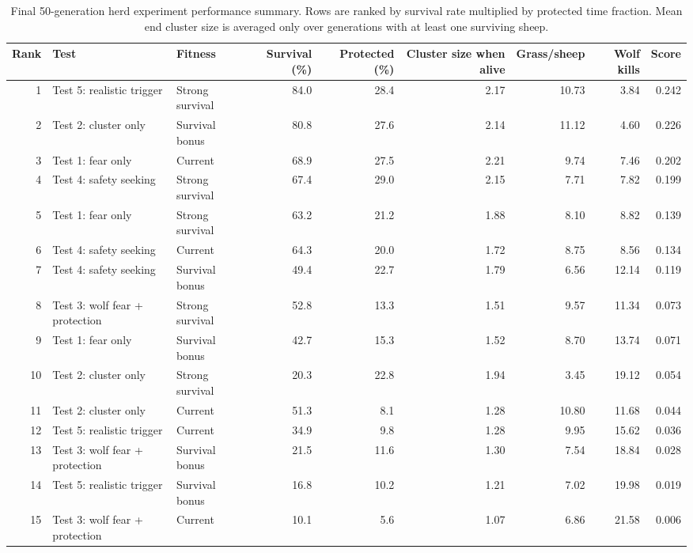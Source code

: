 \begin{table}[ht]
\centering
\caption{Final 50-generation herd experiment performance summary. Rows are ranked by survival rate multiplied by protected time fraction. Mean end cluster size is averaged only over generations with at least one surviving sheep.}
\begin{tabular}{rllrrrrrr}
\hline
Rank & Test & Fitness & Survival (\%) & Protected (\%) & Cluster size when alive & Grass/sheep & Wolf kills & Score \\
\hline
1 & Test 5: realistic trigger & Strong survival & 84.0 & 28.4 & 2.17 & 10.73 & 3.84 & 0.242 \\
2 & Test 2: cluster only & Survival bonus & 80.8 & 27.6 & 2.14 & 11.12 & 4.60 & 0.226 \\
3 & Test 1: fear only & Current & 68.9 & 27.5 & 2.21 & 9.74 & 7.46 & 0.202 \\
4 & Test 4: safety seeking & Strong survival & 67.4 & 29.0 & 2.15 & 7.71 & 7.82 & 0.199 \\
5 & Test 1: fear only & Strong survival & 63.2 & 21.2 & 1.88 & 8.10 & 8.82 & 0.139 \\
6 & Test 4: safety seeking & Current & 64.3 & 20.0 & 1.72 & 8.75 & 8.56 & 0.134 \\
7 & Test 4: safety seeking & Survival bonus & 49.4 & 22.7 & 1.79 & 6.56 & 12.14 & 0.119 \\
8 & Test 3: wolf fear + protection & Strong survival & 52.8 & 13.3 & 1.51 & 9.57 & 11.34 & 0.073 \\
9 & Test 1: fear only & Survival bonus & 42.7 & 15.3 & 1.52 & 8.70 & 13.74 & 0.071 \\
10 & Test 2: cluster only & Strong survival & 20.3 & 22.8 & 1.94 & 3.45 & 19.12 & 0.054 \\
11 & Test 2: cluster only & Current & 51.3 & 8.1 & 1.28 & 10.80 & 11.68 & 0.044 \\
12 & Test 5: realistic trigger & Current & 34.9 & 9.8 & 1.28 & 9.95 & 15.62 & 0.036 \\
13 & Test 3: wolf fear + protection & Survival bonus & 21.5 & 11.6 & 1.30 & 7.54 & 18.84 & 0.028 \\
14 & Test 5: realistic trigger & Survival bonus & 16.8 & 10.2 & 1.21 & 7.02 & 19.98 & 0.019 \\
15 & Test 3: wolf fear + protection & Current & 10.1 & 5.6 & 1.07 & 6.86 & 21.58 & 0.006 \\
\hline
\end{tabular}
\end{table}
